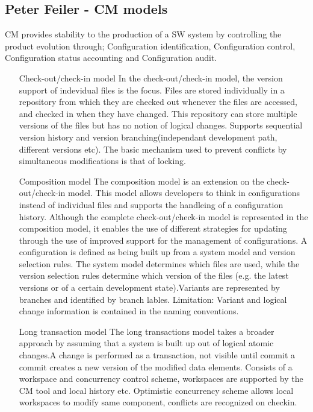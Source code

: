 \documentclass{article}
\begin{document}
\begin{itemize}
\begin{itemize}
    \subsection{Peter Feiler - CM models}
    CM provides stability to the production of a SW system by controlling the product evolution through; Configuration identification, Configuration control, Configuration status accounting and Configuration audit.
    \begin{itemize}
    \item [ Check-out/check-in model]
    In the check-out/check-in model, the version support of indevidual files is the focus. Files are stored individually in a repository from which they are checked out whenever the files are accessed, and checked in when they have changed.
    This repository can store multiple versions of the files but has no notion of logical changes. Supports sequential version history and version branching(independant development path, different versions etc).
    The basic mechanism used to prevent conflicts by simultaneous modifications is that of locking.
    \item[Composition model]
    The composition model is an extension on the check-out/check-in model. This model allows developers to think in configurations instead of individual files and supports the handleing of a configuration history.
    Although the complete check-out/check-in model is represented in the composition model, it enables the use of different strategies for updating through the use of
    improved support for the management of configurations. A configuration is defined as being built up from a system model and version selection rules.
    The system model determines which files are used, while the version selection rules determine which version of the files (e.g. the latest versions or of a certain development state).Variants are represented by branches
    and identified by branch lables. Limitation:  Variant and logical change information is contained in the naming conventions.
    \item[Long transaction model]
    The long transactions model takes a broader approach by assuming that a system is built up out of logical atomic changes.A change is performed as a transaction, not visible until commit a commit creates a new version
    of the modified data elements. Consists of a workspace and concurrency control scheme, workspaces are supported by the CM tool and local history etc. Optimistic concurrency scheme allows local workspaces to 
    modify same component, conflicts are recognized on checkin.

\end{itemize}
\end{itemize}
\end{itemize}
\end{document}

